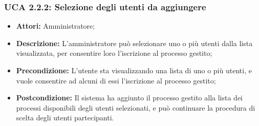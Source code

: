 \hypertarget{A2.2.2}{}
\subsubsection{UCA 2.2.2: Selezione degli utenti da aggiungere}
\begin{itemize}
\item \textbf{Attori:}
Amministratore;
\item \textbf{Descrizione:}
L'amministratore può selezionare uno o più utenti dalla lista visualizzata, per consentire loro l'iscrizione al processo gestito;
\item \textbf{Precondizione:}
L'utente sta visualizzando una lista di uno o più utenti, e vuole consentire ad alcuni di essi l'iscrizione al processo gestito;
\item \textbf{Postcondizione:}
Il sistema ha aggiunto il processo gestito alla lista dei processi disponibili degli utenti selezionati, e può continuare la procedura di scelta degli utenti partecipanti.
\end{itemize}

\hypertarget{A2.3}{}
